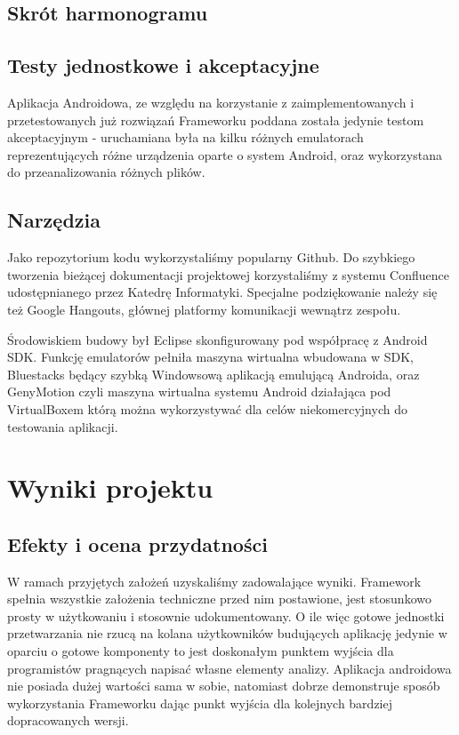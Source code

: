 \section{Skrót harmonogramu}
\section{Testy jednostkowe i akceptacyjne}
Aplikacja Androidowa, ze względu na korzystanie z zaimplementowanych i przetestowanych już rozwiązań Frameworku poddana została jedynie testom akceptacyjnym - uruchamiana była na kilku różnych emulatorach reprezentujących różne urządzenia oparte o system Android, oraz wykorzystana do przeanalizowania różnych plików.
\section{Narzędzia}
Jako repozytorium kodu wykorzystaliśmy popularny Github. Do szybkiego tworzenia bieżącej dokumentacji projektowej korzystaliśmy z systemu Confluence udostępnianego przez Katedrę Informatyki. Specjalne podziękowanie należy się też Google Hangouts, głównej platformy komunikacji wewnątrz zespołu.

Środowiskiem budowy był Eclipse skonfigurowany pod współpracę z Android SDK. Funkcję emulatorów pełniła maszyna wirtualna wbudowana w SDK, Bluestacks będący szybką Windowsową aplikacją emulującą Androida, oraz GenyMotion czyli maszyna wirtualna systemu Android działająca pod VirtualBoxem którą można wykorzystywać dla celów niekomercyjnych do testowania aplikacji.

\chapter{Wyniki projektu}
\section{Efekty i ocena przydatności}
W ramach przyjętych założeń uzyskaliśmy zadowalające wyniki. Framework spełnia wszystkie założenia techniczne przed nim postawione, jest stosunkowo prosty w użytkowaniu i stosownie udokumentowany. O ile więc gotowe jednostki przetwarzania nie rzucą na kolana użytkowników budujących aplikację jedynie w oparciu o gotowe komponenty to jest doskonałym punktem wyjścia dla programistów pragnących napisać własne elementy analizy. Aplikacja androidowa nie posiada dużej wartości sama w sobie, natomiast dobrze demonstruje sposób wykorzystania Frameworku dając punkt wyjścia dla kolejnych bardziej dopracowanych wersji.

